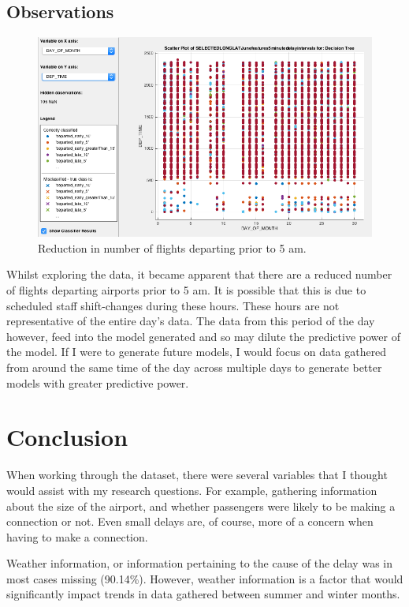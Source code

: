 \documentclass[a4paper, 10pt]{article}
\begin{document}
\subsection{Observations}

\begin{figure}[H]
\begin{center}
\includegraphics[scale=0.45]{4am}
\caption{Reduction in number of flights departing prior to 5 am.}
\label{4am}
\end{center}
\end{figure}
Whilst exploring the data, it became apparent that there are a reduced number of flights departing airports prior to 5 am. It is possible that this is due to scheduled staff shift-changes during these hours. These hours are not representative of the entire day's data. The data from this period of the day however, feed into the model generated and so may dilute the predictive power of the model. If I were to generate future models, I would focus on data gathered from around the same time of the day across multiple days to generate better models with greater predictive power.

\section{Conclusion}
When working through the dataset, there were several variables that I thought would assist with my research questions.  For example, gathering information about the size of the airport, and whether passengers were likely to be making a connection or not. Even small delays are, of course, more of a concern when having to make a connection. 

\vspace{5mm}
Weather information, or information pertaining to the cause of the delay was in most cases missing (90.14\%). However, weather information is a factor that would significantly impact trends in data gathered between summer and winter months. 
\end{document}

